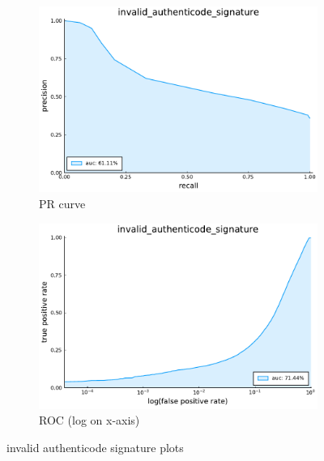 \begin{figure}
    \centering
    \begin{subfigure}{.49\textwidth}
      \centering
      \includegraphics[width=1\linewidth]{pdfs/modperf/invalid_authenticode_signature.bson-pr.pdf}
      \caption{PR curve}
    \end{subfigure}
    \begin{subfigure}{.49\textwidth}
        \centering
        \includegraphics[width=1\linewidth]{pdfs/modperf/invalid_authenticode_signature.bson-roclog.pdf}
        \caption{ROC (log on x-axis)}
    \end{subfigure}
    \caption{invalid authenticode signature plots}
    \label{fig:fig}
\end{figure}

